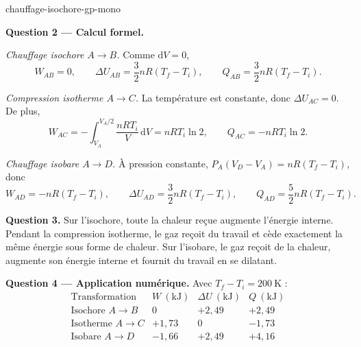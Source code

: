 \begin{exo}{chauffage-isochore-gp-mono}
\begin{solution}
\textbf{Question 2 --- Calcul formel.}

\emph{Chauffage isochore $A\to B$.} Comme $\mathrm{d}V=0$,
\[
W_{AB}=0,
\qquad
\Delta U_{AB}=\frac32nR(T_f-T_i),
\qquad
Q_{AB}=\frac32nR(T_f-T_i).
\]

\emph{Compression isotherme $A\to C$.} La température est constante, donc
$\Delta U_{AC}=0$. De plus,
\[
W_{AC}
=-\int_{V_A}^{V_A/2}\frac{nRT_i}{V}\,\mathrm{d}V
=nRT_i\ln2,
\qquad
Q_{AC}=-nRT_i\ln2.
\]

\emph{Chauffage isobare $A\to D$.} À pression constante,
$P_A(V_D-V_A)=nR(T_f-T_i)$, donc
\[
W_{AD}=-nR(T_f-T_i),
\qquad
\Delta U_{AD}=\frac32nR(T_f-T_i),
\qquad
Q_{AD}=\frac52nR(T_f-T_i).
\]

\textbf{Question 3.} Sur l'isochore, toute la chaleur reçue augmente
l'énergie interne. Pendant la compression isotherme, le gaz reçoit du travail
et cède exactement la même énergie sous forme de chaleur. Sur l'isobare, le
gaz reçoit de la chaleur, augmente son énergie interne et fournit du travail
en se dilatant.

\textbf{Question 4 --- Application numérique.} Avec
$T_f-T_i=200\ \mathrm{K}$ :
\[
\begin{array}{c|r|r|r}
\text{Transformation} & W\ (\mathrm{kJ})
& \Delta U\ (\mathrm{kJ}) & Q\ (\mathrm{kJ}) \\ \hline
\text{Isochore }A\to B & 0 & +2{,}49 & +2{,}49 \\
\text{Isotherme }A\to C & +1{,}73 & 0 & -1{,}73 \\
\text{Isobare }A\to D & -1{,}66 & +2{,}49 & +4{,}16
\end{array}
\]
\end{solution}
\end{exo}

